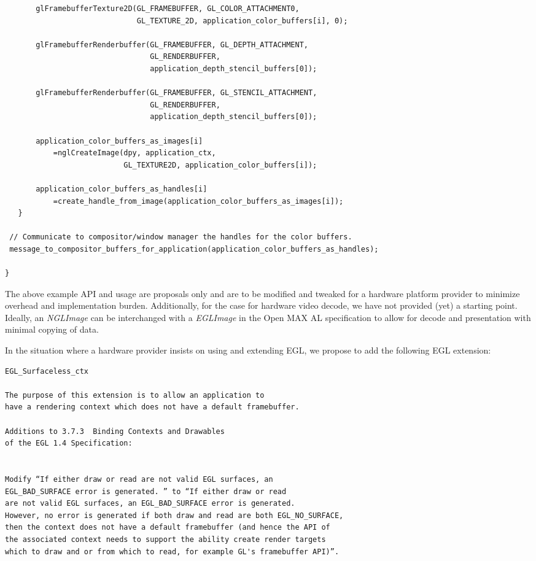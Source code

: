 \documentclass[a4paper,11pt]{article}
\begin{document}
\begin{indenter}{2cm}
\begin{verbatim}
       glFramebufferTexture2D(GL_FRAMEBUFFER, GL_COLOR_ATTACHMENT0, 
                              GL_TEXTURE_2D, application_color_buffers[i], 0);

       glFramebufferRenderbuffer(GL_FRAMEBUFFER, GL_DEPTH_ATTACHMENT, 
                                 GL_RENDERBUFFER, 
                                 application_depth_stencil_buffers[0]);
 
       glFramebufferRenderbuffer(GL_FRAMEBUFFER, GL_STENCIL_ATTACHMENT, 
                                 GL_RENDERBUFFER, 
                                 application_depth_stencil_buffers[0]);
       
       application_color_buffers_as_images[i]
           =nglCreateImage(dpy, application_ctx, 
                           GL_TEXTURE2D, application_color_buffers[i]);

       application_color_buffers_as_handles[i]
           =create_handle_from_image(application_color_buffers_as_images[i]);
   }

 // Communicate to compositor/window manager the handles for the color buffers.
 message_to_compositor_buffers_for_application(application_color_buffers_as_handles);
   
}
\end{verbatim}

The above example API and usage are proposals only and are to be modified and tweaked for a hardware platform provider to minimize overhead and implementation burden. Additionally, for the case for hardware video decode, we have not provided (yet) a starting point. Ideally, an \textit{NGLImage} can be interchanged with a \textit{EGLImage} in the Open MAX AL specification to allow for decode and presentation with minimal copying of data.

In the situation where a hardware provider insists on using and extending EGL, we propose to add the following EGL extension:
\begin{indenter}{1cm}
\begin{verbatim}
EGL_Surfaceless_ctx

The purpose of this extension is to allow an application to 
have a rendering context which does not have a default framebuffer.  

Additions to 3.7.3  Binding Contexts and Drawables 
of the EGL 1.4 Specification:


Modify “If either draw or read are not valid EGL surfaces, an 
EGL_BAD_SURFACE error is generated. ” to “If either draw or read 
are not valid EGL surfaces, an EGL_BAD_SURFACE error is generated. 
However, no error is generated if both draw and read are both EGL_NO_SURFACE, 
then the context does not have a default framebuffer (and hence the API of 
the associated context needs to support the ability create render targets 
which to draw and or from which to read, for example GL's framebuffer API)”.


\end{verbatim}
\end{indenter}
\end{indenter}
\end{document}
